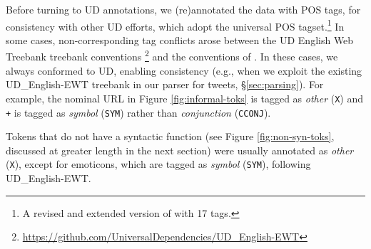 \documentclass[11pt,a4paper]{article}
\newcommand{\heart}{\ensuremath\heartsuit}
\begin{document}
Before turning to UD annotations, we (re)annotated the data with 
POS tags, for consistency with other UD efforts,
which adopt the universal POS tagset.\footnote{A revised and extended version of \citet{PETROV12.274} with 17 tags.}
In some cases,  non-corresponding tag conflicts arose between the UD English Web Treebank 
treebank conventions \cite[UD\_English-EWT;][]{Marneffe2014UniversalSD}\footnote{\url{https://github.com/UniversalDependencies/UD_English-EWT}}
and the conventions of .  %
In these cases, we always
conformed to UD, enabling consistency (e.g., when we exploit the
existing UD\_English-EWT treebank in our parser for tweets, \S\ref{sec:parsing}).  For example,  
the nominal URL in Figure \ref{fig:informal-toks} is tagged as {\it
  other} ({\tt X}) and {\tt +} is tagged as {\it symbol} ({\tt SYM})
rather than {\it conjunction} ({\tt CCONJ}).  

Tokens that do not have a syntactic function (see Figure \ref{fig:non-syn-toks}, discussed at greater
length in the next section) were usually annotated as \emph{other}
(\texttt{X}), except for emoticons, which are tagged as \emph{symbol}
(\texttt{SYM}), following UD\_English-EWT.
\end{document}
